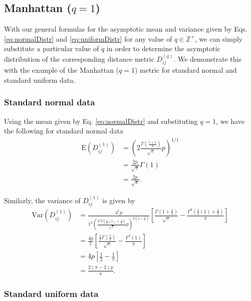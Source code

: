 \documentclass[10pt,letterpaper]{article}\usepackage[]{graphicx}\usepackage[]{color}
\begin{document}
\subsection{Manhattan \texorpdfstring{($q=1$)}{}}

With our general formulas for the asymptotic mean and variance given by Eqs. \ref{eq:normalDistr} and \ref{eq:uniformDistr} for any value of $q \in \mathbb{Z}^+$, we can simply substitute a particular value of $q$ in order to determine the asymptotic distribution of the corresponding distance metric $D^{(q)}_{ij}$. We demonstrate this with the example of the Manhattan ($q=1$) metric for standard normal and standard uniform data.

\subsubsection{Standard normal data}

Using the mean given by Eq. \ref{eq:normalDistr} and substituting $q=1$, we have the following for standard normal data
%
\begin{equation}\label{eq:normalManMean}
\begin{aligned}
\text{E}\left(D^{(1)}_{ij}\right) &= \left(2\frac{\Gamma\left(\frac{1 + 1}{2}\right)}{\sqrt{\pi}}p\right)^{1/1} \\
&= \frac{2p}{\sqrt{\pi}}\Gamma(1) \\
&= \frac{2p}{\sqrt{\pi}}.
\end{aligned}
\end{equation}

Similarly, the variance of $D^{(1)}_{ij}$ is given by
%
\begin{equation}\label{eq:normalManVar}
\begin{aligned}
\text{Var}\left(D^{(1)}_{ij}\right) &= \frac{4^1p}{1^2\left(\frac{2^1\Gamma\left(\frac{1}{2}(1) + \frac{1}{2}\right)}{\sqrt{\pi}}p\right)^{2\left(1 - \frac{1}{1}\right)}}\left[\frac{\Gamma\left(1 + \frac{1}{2}\right)}{\sqrt{\pi}} - \frac{\Gamma^2\left(\frac{1}{2}(1) + \frac{1}{2}\right)}{\pi}\right] \\
&= \frac{4p}{1}\left[\frac{\frac{1}{2}\Gamma\left(\frac{1}{2}\right)}{\sqrt{\pi}} - \frac{\Gamma^2(1)}{\pi}\right] \\
&= 4p\left[\frac{1}{2} - \frac{1}{\pi}\right] \\
&= \frac{2(\pi - 2)p}{\pi}.
\end{aligned}
\end{equation}

\subsubsection{Standard uniform data}
\end{document}
